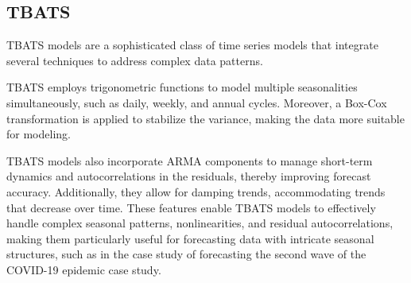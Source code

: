 \documentclass[conference]{IEEEtran}
\begin{document}
\subsection{TBATS}  
TBATS models are a sophisticated class of time series models that integrate several techniques to address complex data patterns. 

TBATS employs trigonometric functions to model multiple seasonalities simultaneously, such as daily, weekly, and annual cycles. Moreover, a Box-Cox transformation is applied to stabilize the variance, making the data more suitable for modeling.

TBATS models also incorporate ARMA components to manage short-term dynamics and autocorrelations in the residuals, thereby improving forecast accuracy. Additionally, they allow for damping trends, accommodating trends that decrease over time. These features enable TBATS models to effectively handle complex seasonal patterns, nonlinearities, and residual autocorrelations, making them particularly useful for forecasting data with intricate seasonal structures, such as in the case study of forecasting the second wave of the COVID-19 epidemic case study.\cite{b5}
\end{document}
